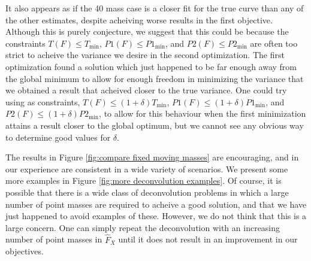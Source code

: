 It also appears as if the 40 mass case is a closer fit for the true curve than any of the other estimates, despite acheiving worse results in the first objective. Although this is purely conjecture, we suggest that this could be because the constraints $T(F) \leq T_\mathrm{min}$, $P1(F) \leq P1_\mathrm{min}$, and $P2(F) \leq P2_\mathrm{min}$ are often too strict to acheive the variance we desire in the second optimization. The first optimization found a solution which just happened to be far enough away from the global minimum to allow for enough freedom in minimizing the variance that we obtained a result that acheived closer to the true variance. One could try using as constraints, $T(F) \leq (1 + \delta) T_\mathrm{min}$, $P1(F) \leq (1 + \delta) P1_\mathrm{min}$, and $P2(F) \leq (1 + \delta) P2_\mathrm{min}$, to allow for this behaviour when the first minimization attains a result closer to the global optimum, but we cannot see any obvious way to determine good values for $\delta$.

The results in Figure \ref{fig:compare fixed moving masses} are encouraging, and in our experience are consistent in a wide variety of scenarios. We present some more examples in Figure \ref{fig:more deconvolution examples}. Of course, it is possible that there is a wide class of deconvolution problems in which a large number of point masses are required to acheive a good solution, and that we have just happened to avoid examples of these. However, we do not think that this is a large concern. One can simply repeat the deconvolution with an increasing number of point masses in $\hat{F}_X$ until it does not result in an improvement in our objectives.

